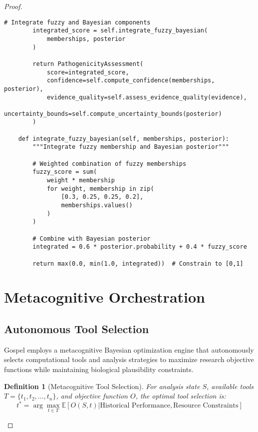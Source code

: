\documentclass[12pt,a4paper]{article}
\newtheorem{definition}[theorem]{Definition}
\begin{document}
\begin{proof}
\begin{lstlisting}[style=pythonstyle, caption=Fuzzy-Bayesian Network Implementation]
        # Integrate fuzzy and Bayesian components
        integrated_score = self.integrate_fuzzy_bayesian(
            memberships, posterior
        )
        
        return PathogenicityAssessment(
            score=integrated_score,
            confidence=self.compute_confidence(memberships, posterior),
            evidence_quality=self.assess_evidence_quality(evidence),
            uncertainty_bounds=self.compute_uncertainty_bounds(posterior)
        )
        
    def integrate_fuzzy_bayesian(self, memberships, posterior):
        """Integrate fuzzy membership and Bayesian posterior"""
        
        # Weighted combination of fuzzy memberships
        fuzzy_score = sum(
            weight * membership 
            for weight, membership in zip(
                [0.3, 0.25, 0.25, 0.2], 
                memberships.values()
            )
        )
        
        # Combine with Bayesian posterior
        integrated = 0.6 * posterior.probability + 0.4 * fuzzy_score
        
        return max(0.0, min(1.0, integrated))  # Constrain to [0,1]
\end{lstlisting}

\section{Metacognitive Orchestration}

\subsection{Autonomous Tool Selection}

Gospel employs a metacognitive Bayesian optimization engine that autonomously selects computational tools and analysis strategies to maximize research objective functions while maintaining biological plausibility constraints.

\begin{definition}[Metacognitive Tool Selection]
For analysis state $S$, available tools $T = \{t_1, t_2, \ldots, t_n\}$, and objective function $O$, the optimal tool selection is:
\begin{equation}
t^* = \arg\max_{t \in T} \mathbb{E}[O(S, t) | \text{Historical Performance}, \text{Resource Constraints}]
\end{equation}
\end{definition}


\end{proof}
\end{document}
